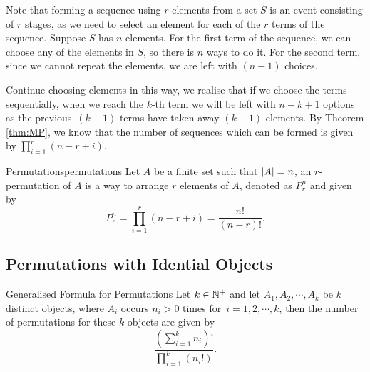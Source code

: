 \documentclass[math]{amznotes}
\theoremstyle{remark}
\begin{document}
Note that forming a sequence using $r$ elements from a set $S$ is an event consisting of $r$ stages, as we need to select an element for each of the $r$ terms of the sequence. Suppose $S$ has $n$ elements. For the first term of the sequence, we can choose any of the elements in $S$, so there is $n$ ways to do it. For the second term, since we cannot repeat the elements, we are left with $(n - 1)$ choices. 

Continue choosing elements in this way, we realise that if we choose the terms sequentially, when we reach the $k$-th term we will be left with $n - k + 1$ options as the previous~$(k - 1)$ terms have taken away $(k - 1)$ elements. By Theorem \ref{thm:MP}, we know that the number of sequences which can be formed is given by $\prod_{i = 1}^{r}(n - r + i)$.
\begin{dfnbox}{Permutations}{permutations}
    Let $A$ be a finite set such that ${\left\lvert {A} \right\rvert} = n$, an $r$-permutation of $A$ is a way to arrange $r$ elements of $A$, denoted as $P^n_r$ and given by
    \begin{equation*}
        P^n_r = \prod_{i = 1}^{r}(n - r + i) = \frac{n!}{(n - r)!}.
    \end{equation*}
\end{dfnbox}
\subsection{Permutations with Idential Objects}
\begin{thmbox}{Generalised Formula for Permutations}{}
    Let $k \in \mathbb{N}^+$ and let $A_1, A_2, \cdots, A_k$ be $k$ distinct objects, where $A_i$ occurs $n_i > 0$ times for~$i = 1, 2, \cdots, k$, then the number of permutations for these $k$ objects are given by
    \begin{equation*}
        \frac{\left(\sum_{i = 1}^{k}n_i\right)!}{\prod_{i = 1}^{k}\left(n_i!\right)}.
    \end{equation*}
\end{thmbox}
\end{document}
